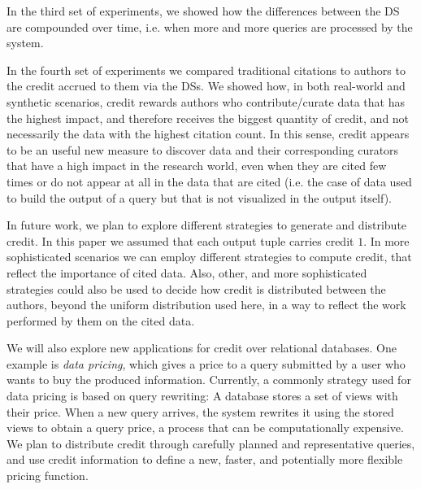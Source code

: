 In the third set of experiments, we showed how the differences between the DS are compounded over time, i.e. when more and more queries are processed by the system.

In the fourth set of experiments we compared traditional citations to authors to the credit accrued to them via the DSs. We showed how, in both real-world and synthetic scenarios, credit rewards authors 
who contribute/curate data that has the highest impact, and therefore receives the biggest quantity of credit, and not necessarily the data with the highest citation count. 
In this sense, credit appears to be an useful new measure to discover data and their corresponding curators that have a high impact in the research world, even when they are cited few times or do not appear at all in the data that are cited (i.e. the case of data used to build the output of a query but that is not visualized in the output itself).

 

In future work, we plan to explore different strategies to generate and distribute credit. In this paper we assumed that each output tuple carries credit $1$. In more sophisticated scenarios we can employ different strategies to compute credit, that reflect the importance of cited data.
Also, other, and more sophisticated strategies could also be used to decide how credit is distributed between the authors, beyond the uniform distribution used here, in a way to reflect the work performed by them on the cited data.

We will also explore new applications for credit over relational databases.
One example is \emph{data pricing}, which gives a price to a query submitted by a user who wants to buy the produced information. Currently, a commonly strategy used for data pricing is based on query rewriting:  A database stores a set of views with their price. When a new query arrives, the system rewrites it using the stored views to obtain a query price, a process that can be computationally expensive.
We plan to distribute credit through carefully planned and representative queries, and use credit information to define a new, faster, and potentially more flexible pricing function.

